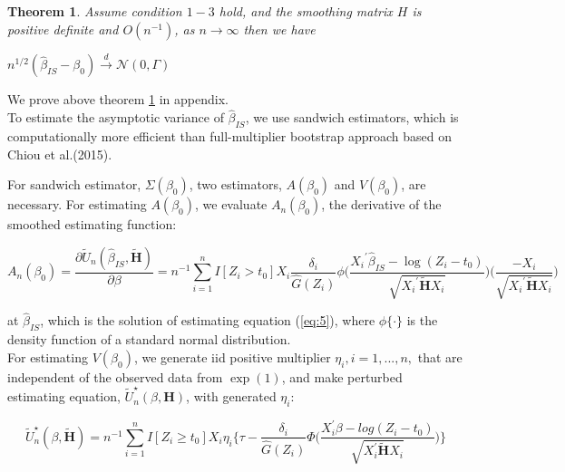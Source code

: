 \documentclass[12pt]{article}
\newtheorem{theorem}{Theorem}
\begin{document}
	\begin{theorem} \label{thm:1}
	Assume condition $1-3$ hold, and the smoothing matrix $H$ is positive definite and $O(n^{-1})$, as $n\to\infty$ then we have
		\begin{center}
			$n^{1/2}(\hat{\beta}_{IS}-\beta_0) \xrightarrow{d} \mathcal{N}(0,\Gamma)$
		\end{center}
	\end{theorem}
	
	\noindent We prove above theorem \ref{thm:1} in appendix.\\
	
	\noindent To estimate the asymptotic variance of $\hat{\beta}_{IS}$, we use sandwich estimators, which is computationally more efficient than full-multiplier bootstrap approach based on Chiou et al.(2015). 
	
	\noindent For sandwich estimator, $\Sigma(\beta_0)$, two estimators, $A(\beta_0)$ and $V(\beta_0)$, are necessary. For estimating $A(\beta_0)$, 
	we evaluate $A_n(\beta_0)$, the derivative of the smoothed estimating function:
	
	\begin{equation}
	A_n(\beta_0) = \frac{\partial \tilde{U}_n(\hat{\beta}_{IS}, \tilde{\textbf{H}})}{\partial \beta} = n^{-1}\sum_{i=1}^{n} I[Z_i>t_0] X_i \frac{\delta_i}{\hat{G}(Z_i)} \phi\bigg(\frac{{X_i}^{\prime}\hat{\beta}_{IS}-\log(Z_i-t_0)}{\sqrt{{X_i}^{\prime}\tilde{\textbf{H}} X_i}}\bigg)\bigg(\frac{-{X_i}}{\sqrt{{X_i}^{\prime} \tilde{\textbf{H}} {X_i}}}\bigg)
	\end{equation}
	
	\noindent at $\hat{\beta}_{IS}$, which is the solution of estimating equation (\ref{eq:5}), where $\phi \{ \cdot \}$ is the density function of a standard normal distribution.\\
	
	\noindent For estimating $V(\beta_0)$, we generate iid positive multiplier $\eta_i, i=1,...,n,$ that are independent of the observed data from $\exp(1)$, and make perturbed estimating equation, $\tilde{U}^{\star}_n(\beta, \textbf{H})$, with generated $\eta_i$:
	
	\begin{equation} \label{eq:6}
	\tilde{U}^{\star}_n(\beta, \tilde{\textbf{H}}) = n^{-1} \sum_{i=1}^{n} I[Z_i \geq t_0] X_i \eta_i \Big\{\tau - \frac{\delta_i}{\hat{G}(Z_i)}\Phi\Big(\frac{X_i^\prime\beta-log(Z_i-t_0)}{\sqrt{X_i^{\prime} \tilde{\textbf{H}} X_{i}}}\Big)\Big\}
	\end{equation}
	
\end{document}
